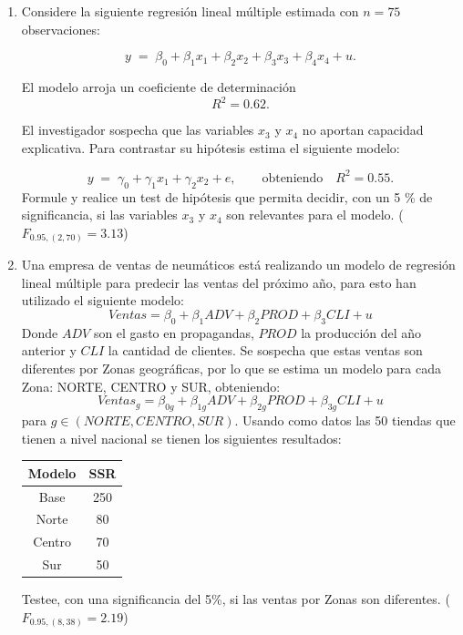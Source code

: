 \documentclass[10pt,a4paper]{article}
\begin{document}
\begin{enumerate}
\begin{enumerate}
    \item  ¿Se puede rechazar la hipótesis nula con la información que disponemos con una significancia del 5\%?

\end{enumerate}

\item  Considere la siguiente regresión lineal múltiple estimada con \(n = 75\) observaciones:

$$
y \;=\; \beta_{0} + \beta_{1}x_{1} + \beta_{2}x_{2} + \beta_{3}x_{3} + \beta_{4}x_{4} + u.
$$

El modelo arroja un coeficiente de determinación
\[
R^2 = 0.62.
\]

El investigador sospecha que las variables \(x_{3}\) y \(x_{4}\) no aportan capacidad explicativa.  
Para contrastar su hipótesis estima el siguiente modelo:

\[
y \;=\; \gamma_{0} + \gamma_{1}x_{1} + \gamma_{2}x_{2} + e,
\qquad\text{obteniendo}\quad
R^2 = 0.55.
\]
Formule y realice un test de hipótesis que permita decidir, con un 5 \% de significancia, si las variables \(x_{3}\) y \(x_{4}\) son relevantes para el modelo. ($F_{0.95,(2,70)}=3.13$)

\item  Una empresa de ventas de neumáticos está realizando un modelo de regresión lineal múltiple para predecir las ventas del próximo año, para esto han utilizado el siguiente modelo:
$$Ventas = \beta_0 + \beta_1ADV + \beta_2PROD+\beta_3CLI + u$$
Donde $ADV$ son el gasto en propagandas, $PROD$ la producción del año anterior y $CLI$ la cantidad de clientes. Se sospecha que estas ventas son diferentes por Zonas geográficas, por lo que se estima un modelo para cada Zona: NORTE, CENTRO y SUR, obteniendo: 
$$Ventas_{g} = \beta_{0g} + \beta_{1g}ADV + \beta_{2g}PROD+\beta_{3g}CLI + u$$
para $g \in {(NORTE,CENTRO,SUR)}$. Usando como datos las 50 tiendas que tienen a nivel nacional se tienen los siguientes resultados:

\begin{center}
    \begin{tabular}{|c|c|}
    \hline
        Modelo & SSR \\
        \hline
        Base & 250 \\
        \hline
        Norte & 80 \\
        \hline
        Centro & 70 \\
        \hline
        Sur & 50 \\
        \hline
    \end{tabular}
\end{center}
Testee, con una significancia del 5\%, si las ventas por Zonas son diferentes. ($F_{0.95,(8,38)}=2.19$)
\end{enumerate}
\end{document}
